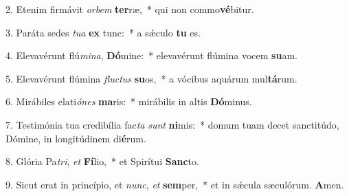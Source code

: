 2. Etenim firmávit \textit{or}\textit{bem} \textbf{ter}ræ,~*  qui non commo\textbf{vé}bitur.\

3. Paráta sedes \textit{tu}\textit{a} \textbf{ex} tunc:~*  a sǽculo \textbf{tu} es.\

4. Elevavérunt flú\textit{mi}\textit{na}, \textbf{Dó}mine:~*  elevavérunt flúmina vocem \textbf{su}am.\

5. Elevavérunt flúmina \textit{fluc}\textit{tus} \textbf{su}os,~*  a vócibus aquárum mul\textbf{tá}rum.\

6. Mirábiles elati\textit{ó}\textit{nes} \textbf{ma}ris:~*  mirábilis in altis \textbf{Dó}minus.\

7. Testimónia tua credibília fac\textit{ta} \textit{sunt} \textbf{ni}mis:~*  domum tuam decet sanctitúdo, Dómine, in longitúdinem di\textbf{é}rum.\

8. Glória Pa\textit{tri}, \textit{et} \textbf{Fí}lio,~*  et Spirítui \textbf{Sanc}to.\

9. Sicut erat in princípio, et \textit{nunc}, \textit{et} \textbf{sem}per,~*  et in sǽcula sæculórum. \textbf{A}men.\

